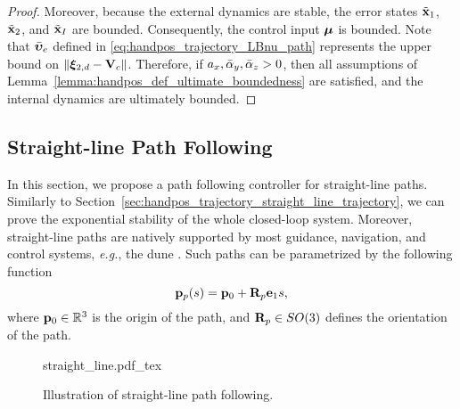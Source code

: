 \begin{proof}
    Moreover, because the external dynamics are stable, the error states $\tilde{\mathbf{x}}_1$, $\tilde{\mathbf{x}}_2$, and $\tilde{\mathbf{x}}_I$ are bounded.
    Consequently, the control input $\bm{\mu}$ is bounded.
    Note that $\Bar{\bm{\upsilon}}_e$ defined in \eqref{eq:handpos_trajectory_LBnu_path} represents the upper bound on $\left\|\bm{\xi}_{2, d} - \mathbf{V}_c\right\|$.
    Therefore, if $a_x, \Bar{\alpha}_y, \Bar{\alpha}_z > 0$, then all assumptions of Lemma~\ref{lemma:handpos_def_ultimate_boundedness} are satisfied, and the internal dynamics are ultimately bounded.
\end{proof}

\subsection{Straight-line Path Following}
\label{sec:handpos_trajectory_straight_line_path}
In this section, we propose a path following controller for straight-line paths.
Similarly to Section~\ref{sec:handpos_trajectory_straight_line_trajectory}, we can prove the exponential stability of the whole closed-loop system.
Moreover, straight-line paths are natively supported by most guidance, navigation, and control systems, \emph{e.g.}, the \acrfull{dune} \cite{dune}.
Such paths can be parametrized by the following function
\begin{equation}
    \mathbf{p}_p(s) = \mathbf{p}_0 + \mathbf{R}_p \mathbf{e}_1 s, \label{eq:handpos_trajectory_straight_line_function}
\end{equation}
where $\mathbf{p}_0 \in \mathbb{R}^3$ is the origin of the path, and $\mathbf{R}_{p} \in SO(3)$ defines the orientation of the path.

\begin{figure}[tb]
    \centering
    \def\svgwidth{0.6\textwidth}
    {straight_line.pdf_tex}
    \caption{Illustration of straight-line path following.}
    \label{fig:straight_line}
\end{figure}

